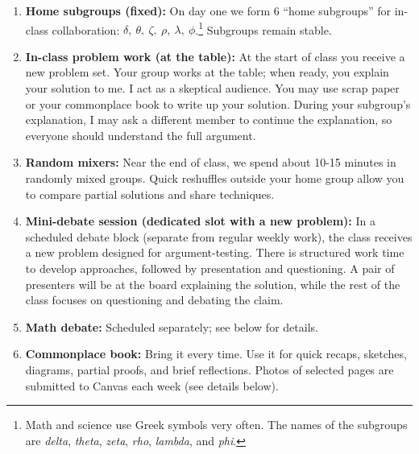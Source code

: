 \documentclass[oneside,11pt]{amsart}
\begin{document}
\begin{enumerate}[$\bullet$]
  \item \textbf{Home subgroups (fixed):} On day one we form 6 ``home subgroups'' for in-class collaboration:
  $\delta, \ \theta, \ \zeta, \ \rho, \ \lambda, \ \phi$.\footnote{Math and science use Greek symbols very often. The names of the subgroups are 
	\emph{delta}, \emph{theta}, \emph{zeta}, \emph{rho}, \emph{lambda}, and \emph{phi}.}
	Subgroups remain stable.

  \item \textbf{In-class problem work (at the table):} At
	the start of class you receive a new problem set.
	Your group works at the table; when ready, you explain
	your solution to me. I act as a skeptical audience.
	You may use scrap paper or your commonplace book to write up your solution.
	During your subgroup's explanation, I may ask a different member to continue the explanation,
	so everyone should understand the full argument.

  \item \textbf{Random mixers:} 
		Near the end of class, we spend about 10-15 minutes 
		in randomly mixed groups.
		Quick reshuffles outside your home group allow you
		to compare partial solutions and share techniques.
		
	 \item \textbf{Mini-debate session (dedicated slot with a new
	 problem):} In a scheduled debate block (separate from
	 regular weekly work), the class receives a {new}
	 problem designed for argument-testing. There is
	 structured {work time} to develop approaches,
	 followed by {presentation and questioning}. 
	 A pair of presenters will be at the board explaining the
	 solution, while the rest of the class 
	 focuses on questioning and debating the claim.
  
	\item \textbf{Math debate:} Scheduled separately; see below for details.

	\item \textbf{Commonplace book:} Bring it every time.
	Use it for quick recaps, sketches, diagrams, partial
	proofs, and brief reflections. Photos of selected pages
	are submitted to Canvas each week (see details below).


\end{enumerate}
\end{document}
